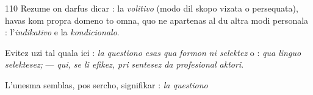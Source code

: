 \begin{VUpage}[114]{110}
Rezume on darfus dicar : la \textit{volitivo} (modo dil skopo\nl
vizata o persequata), havas kom propra domeno to omna,\nl
quo ne apartenas al du altra modi personala : l'\textit{indikativo}\nl
e la \textit{kondicionalo}.

Evitez uzi tal quala ici : \textit{la questiono esas qua formon}\nl
\textit{ni selektez} o : \textit{qua linguo selektesez;} --- \textit{qui, se li efikez, pri}\cc
\textit{sentesez da profesional aktori}.

L'unesma semblas, pos sercho, signifikar : \textit{la questiono}\parplein
\end{VUpage}

